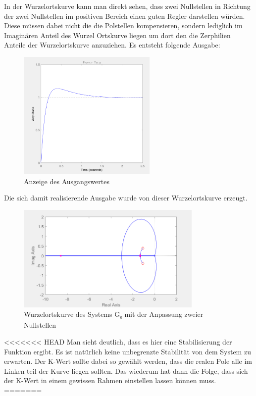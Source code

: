 \documentclass[10pt]{scrartcl}
\begin{document}
In der Wurzelortskurve kann man direkt sehen, dass zwei Nullstellen in Richtung der zwei Nullstellen im positiven Bereich einen guten Regler darstellen würden. Diese müssen dabei nicht die die Polstellen kompensieren, sondern lediglich im Imaginären Anteil des Wurzel Ortskurve liegen um dort den die Zerphilien Anteile der Wurzelortskurve anzuziehen.
Es entsteht folgende Ausgabe:

\begin{figure}[H]
	\centering
	\includegraphics[width=0.6\textwidth]{WOZ9f2}
	\caption{Anzeige des Ausgangswertes}
	\label{img:grafik-dummy}
\end{figure}

Die sich damit realisierende Ausgabe wurde von dieser Wurzelortskurve erzeugt.
\begin{figure}[H]
	\centering
	\includegraphics[width=0.8\textwidth]{WOZ9f3}
	\caption{Wurzelortskurve des Systems G\textsubscript{s} mit der Anpassung zweier Nullstellen}
	\label{img:grafik-dummy}
\end{figure}

<<<<<<< HEAD
Man sieht deutlich, dass es hier eine Stabilisierung der Funktion ergibt. Es ist natürlich keine unbegrenzte Stabilität von dem System zu erwarten. Der K-Wert sollte dabei so gewählt werden, dass die realen Pole alle im Linken teil der Kurve liegen sollten. Das wiederum hat dann die Folge, dass sich der K-Wert in einem gewissen Rahmen einstellen lassen können muss.
=======
\end{document}
